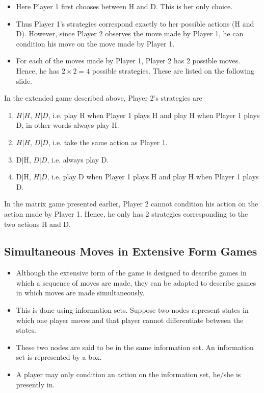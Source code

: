 \documentclass[]{report}
\begin{document}
\begin{itemize}
	\item Here Player 1 first chooses between H and D. This is her only
	choice. 
	\item Thus Player 1’s strategies correspond exactly to her
	possible actions (H and D).
	However, since Player 2 observes the move made by Player 1, he
	can condition his move on the move made by Player 1.
	\item For each of the moves made by Player 1, Player 2 has 2 possible
	moves. Hence, he has $2 \times 2 = 4$ possible strategies. These are
	listed on the following slide.
\end{itemize}


In the extended game described above, Player 2’s strategies are
\begin{enumerate}
	\item  $H|H$, $H|D$, i.e. play H when Player 1 plays H and
	play H when Player 1 plays D, in other words always
	play H.
	\item  $H|H$, $D|D$, i.e. take the same action as Player 1.
	\item  D|H, $D|D$, i.e. always play D.
	\item  D|H, $H|D$, i.e. play D when Player 1 plays H and
	play H when Player 1 plays D.
\end{enumerate}

In the matrix game presented earlier, Player 2 cannot condition his
action on the action made by Player 1. Hence, he only has 2
strategies corresponding to the two actions H and D.

\subsection{Simultaneous Moves in Extensive Form Games}
\begin{itemize}
	\item Although the extensive form of the game is designed to describe
	games in which a sequence of moves are made, they can be
	adapted to describe games in which moves are made
	simultaneously.
	\item This is done using information sets. Suppose two nodes represent
	states in which one player moves and that player cannot
	differentiate between the states.
	\item These two nodes are said to be in the same information set. An
	information set is represented by a box.
	\item A player may only condition an action on the information set,
	he/she is presently in.
\end{itemize}
\end{document}
